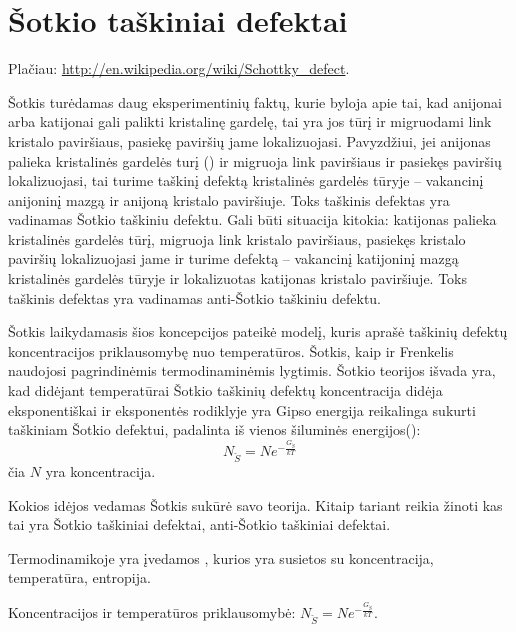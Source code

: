 \section{Šotkio taškiniai defektai}

Plačiau: \url{http://en.wikipedia.org/wiki/Schottky_defect}.

Šotkis turėdamas daug eksperimentinių faktų, kurie byloja apie tai, kad
anijonai arba katijonai gali palikti kristalinę gardelę, tai yra
jos tūrį ir migruodami link kristalo paviršiaus, pasiekę
paviršių jame lokalizuojasi. Pavyzdžiui, jei anijonas palieka kristalinės
gardelės turį () ir migruoja link paviršiaus ir pasiekęs
paviršių lokalizuojasi, tai turime taškinį defektą kristalinės
gardelės tūryje – vakancinį anijoninį mazgą ir anijoną kristalo
paviršiuje. Toks taškinis defektas yra vadinamas Šotkio taškiniu
defektu. Gali būti situacija kitokia: katijonas palieka kristalinės
gardelės tūrį, migruoja link kristalo paviršiaus, pasiekęs kristalo
paviršių lokalizuojasi jame ir turime defektą – vakancinį katijoninį
mazgą kristalinės gardelės tūryje ir lokalizuotas katijonas kristalo
paviršiuje. Toks taškinis defektas yra vadinamas anti-Šotkio taškiniu
defektu.

Šotkis laikydamasis šios koncepcijos pateikė modelį, kuris aprašė
taškinių defektų koncentracijos priklausomybę nuo temperatūros.
Šotkis, kaip ir Frenkelis naudojosi pagrindinėmis termodinaminėmis
lygtimis. Šotkio teorijos išvada yra, kad didėjant temperatūrai
Šotkio taškinių defektų koncentracija didėja eksponentiškai ir
eksponentės rodiklyje yra Gipso energija reikalinga sukurti
taškiniam Šotkio defektui, padalinta iš vienos šiluminės
energijos():
\begin{equation*}
  N_{\check{S}} = N e^{-\frac{G_{\check{S}}}{kT}}
\end{equation*}
čia $N$ yra koncentracija.

 
\begin{remember}
  \item Kokios idėjos vedamas Šotkis sukūrė savo teorija. Kitaip tariant
    reikia žinoti kas tai yra Šotkio taškiniai defektai, anti-Šotkio
    taškiniai defektai.
  \item Termodinamikoje yra įvedamos , kurios yra susietos
    su koncentracija, temperatūra, entropija.
  \item Koncentracijos ir temperatūros priklausomybė:
    $N_{\check{S}} = N e^{-\frac{G_{\check{S}}}{kT}}$.
\end{remember}

